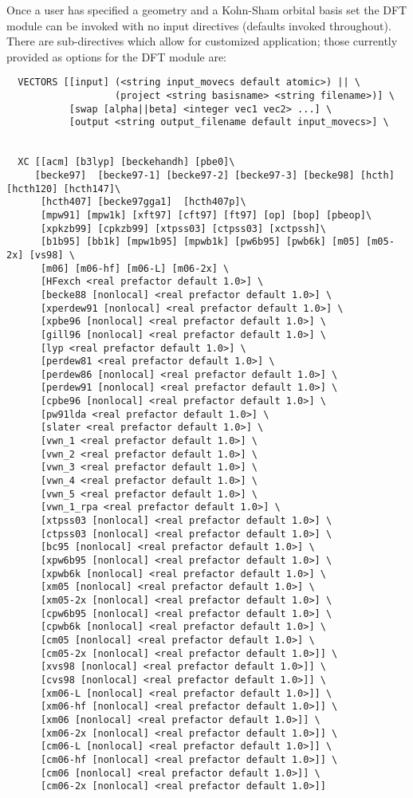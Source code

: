 Once a user has specified a geometry and a Kohn-Sham orbital basis set
the DFT module can be invoked with no input directives (defaults 
invoked throughout).  There are sub-directives which allow for 
customized application; those currently provided as options for 
the DFT module are:
\begin{verbatim}
  VECTORS [[input] (<string input_movecs default atomic>) || \
                   (project <string basisname> <string filename>)] \
           [swap [alpha||beta] <integer vec1 vec2> ...] \
           [output <string output_filename default input_movecs>] \


  XC [[acm] [b3lyp] [beckehandh] [pbe0]\
     [becke97]  [becke97-1] [becke97-2] [becke97-3] [becke98] [hcth] [hcth120] [hcth147]\
      [hcth407] [becke97gga1]  [hcth407p]\
      [mpw91] [mpw1k] [xft97] [cft97] [ft97] [op] [bop] [pbeop]\
      [xpkzb99] [cpkzb99] [xtpss03] [ctpss03] [xctpssh]\
      [b1b95] [bb1k] [mpw1b95] [mpwb1k] [pw6b95] [pwb6k] [m05] [m05-2x] [vs98] \
      [m06] [m06-hf] [m06-L] [m06-2x] \
      [HFexch <real prefactor default 1.0>] \
      [becke88 [nonlocal] <real prefactor default 1.0>] \
      [xperdew91 [nonlocal] <real prefactor default 1.0>] \
      [xpbe96 [nonlocal] <real prefactor default 1.0>] \
      [gill96 [nonlocal] <real prefactor default 1.0>] \
      [lyp <real prefactor default 1.0>] \
      [perdew81 <real prefactor default 1.0>] \
      [perdew86 [nonlocal] <real prefactor default 1.0>] \
      [perdew91 [nonlocal] <real prefactor default 1.0>] \
      [cpbe96 [nonlocal] <real prefactor default 1.0>] \
      [pw91lda <real prefactor default 1.0>] \
      [slater <real prefactor default 1.0>] \
      [vwn_1 <real prefactor default 1.0>] \
      [vwn_2 <real prefactor default 1.0>] \
      [vwn_3 <real prefactor default 1.0>] \
      [vwn_4 <real prefactor default 1.0>] \
      [vwn_5 <real prefactor default 1.0>] \
      [vwn_1_rpa <real prefactor default 1.0>] \
      [xtpss03 [nonlocal] <real prefactor default 1.0>] \
      [ctpss03 [nonlocal] <real prefactor default 1.0>] \
      [bc95 [nonlocal] <real prefactor default 1.0>] \
      [xpw6b95 [nonlocal] <real prefactor default 1.0>] \
      [xpwb6k [nonlocal] <real prefactor default 1.0>] \
      [xm05 [nonlocal] <real prefactor default 1.0>] \
      [xm05-2x [nonlocal] <real prefactor default 1.0>] \
      [cpw6b95 [nonlocal] <real prefactor default 1.0>] \
      [cpwb6k [nonlocal] <real prefactor default 1.0>] \
      [cm05 [nonlocal] <real prefactor default 1.0>] \
      [cm05-2x [nonlocal] <real prefactor default 1.0>]] \
      [xvs98 [nonlocal] <real prefactor default 1.0>]] \
      [cvs98 [nonlocal] <real prefactor default 1.0>]] \
      [xm06-L [nonlocal] <real prefactor default 1.0>]] \
      [xm06-hf [nonlocal] <real prefactor default 1.0>]] \
      [xm06 [nonlocal] <real prefactor default 1.0>]] \
      [xm06-2x [nonlocal] <real prefactor default 1.0>]] \
      [cm06-L [nonlocal] <real prefactor default 1.0>]] \
      [cm06-hf [nonlocal] <real prefactor default 1.0>]] \
      [cm06 [nonlocal] <real prefactor default 1.0>]] \
      [cm06-2x [nonlocal] <real prefactor default 1.0>]] 




\end{verbatim}
